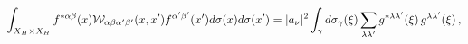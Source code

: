 \begin{equation}
\int _{X_H \times X_H}f^{*\alpha\beta}(x) {\cal
W}_{\alpha\beta\alpha'\beta'}(x,x')
f^{\alpha'\beta'}(x')d\sigma(x)d\sigma(x')=\vert
a_{\nu}\vert^{2}\int_{\gamma}d\sigma_{\gamma}(\xi)\sum_{\lambda\lambda'}
g^{*\lambda\lambda'}(\xi)\,g^{\lambda\lambda'}(\xi)\,,
\end{equation}

